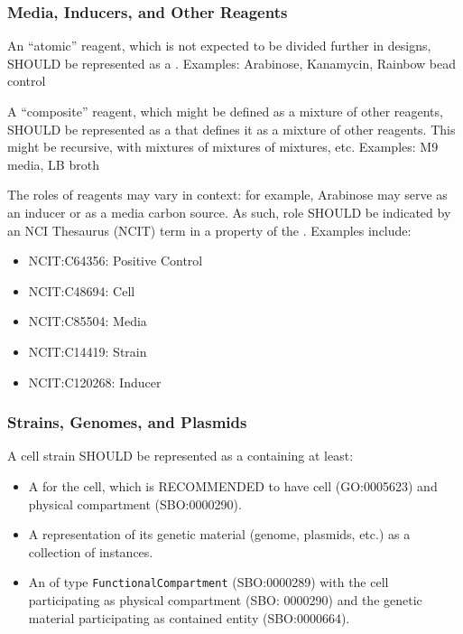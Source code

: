 \subsubsection{Media, Inducers, and Other Reagents}

An ``atomic'' reagent, which is not expected to be divided further in designs, SHOULD be represented as a \linebreak {}. Examples: Arabinose, Kanamycin, Rainbow bead control

A ``composite'' reagent, which might be defined as a mixture of other reagents, SHOULD be represented as a  that defines it as a mixture of other reagents. This might be recursive, with mixtures of mixtures of mixtures, etc. Examples: M9 media, LB broth

The roles of reagents may vary in context: for example, Arabinose may serve as an inducer or as a media carbon source. As such, role SHOULD be indicated by an NCI Thesaurus (NCIT) term in a  property of the . Examples include:
\begin{itemize}
\item NCIT:C64356: Positive Control
\item NCIT:C48694: Cell
\item NCIT:C85504: Media
\item NCIT:C14419: Strain
\item NCIT:C120268: Inducer
\end{itemize}

\subsubsection{Strains, Genomes, and Plasmids}

A cell strain SHOULD be represented as a  containing at least:
\begin{itemize}
\item A  for the cell, which is RECOMMENDED to have  cell (GO:0005623) and  physical compartment (SBO:0000290).
\item A representation of its genetic material (genome, plasmids, etc.) as a collection of  instances.
\item An  of type \texttt{FunctionalCompartment} (SBO:0000289) with the cell participating as physical compartment (SBO: 0000290) and the genetic material participating as contained entity (SBO:0000664).
\end{itemize}


